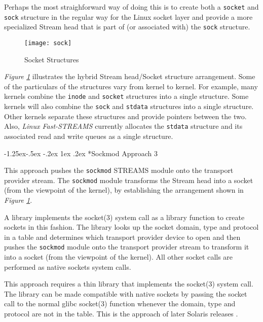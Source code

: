 \documentclass[letterpaper,final,notitlepage,twocolumn,10pt,twoside]{article}
\makeatletter
\renewcommand\subsubsection{\@startsection{subsubsection}{3}{\z@}%
                                     {-1.25ex\@plus -.5ex \@minus -.2ex}%
                                     {1ex \@plus .2ex}%
                                     {\normalfont\normalsize\bfseries}}
\makeatother
\begin{document}
Perhaps the most straighforward way of doing this is to create both a
\texttt{socket} and \texttt{sock} structure in the regular way for the Linux
socket layer and provide a more specialized Stream head that is part of (or
associated with) the \texttt{sock} structure.

\begin{figure}[hbtp]
\begin{center}
\texttt{[image: sock]}
\end{center}
\caption[Socket Structures]{Socket Structures}
\label{figure:sock}
\end{figure}

\textit{Figure \ref{figure:sock}} illustrates the hybrid Stream head/Socket
structure arrangement.  Some of the particulars of the structures vary from
kernel to kernel.  For example, many kernels combine the \texttt{inode} and
\texttt{socket} structures into a single structure.  Some kernels will also
combine the \texttt{sock} and \texttt{stdata} structures into a single
structure.  Other kernels separate these structures and provide pointers
between the two.  Also, \textsl{Linux Fast-STREAMS} currently allocates the
\texttt{stdata} structure and its associated read and write queues as a single
structure.

\subsubsection*{Sockmod Approach 3}

This approach pushes the \texttt{sockmod} STREAMS module onto the transport
provider stream.  The \texttt{sockmod} module transforms the Stream head into
a socket (from the viewpoint of the kernel), by establishing the arrangement
shown in \textit{Figure \ref{figure:sock}}.

A library implements the socket(3) system call as a library function to create
sockets in this fashion.  The library looks up the socket domain, type and
protocol in a table and determines which transport provider device to open and
then pushes the \texttt{sockmod} module onto the transport provider stream to
transform it into a socket (from the viewpoint of the kernel).  All other
socket calls are performed as native sockets system calls.

This approach requires a thin library that implements the socket(3) system
call.  The library can be made compatible with native sockets by passing the
socket call to the normal glibc socket(3) function whenever the domain, type
and protocol are not in the table.  This is the approach of later Solaris
releases \cite[]{socklib}.
\end{document}
